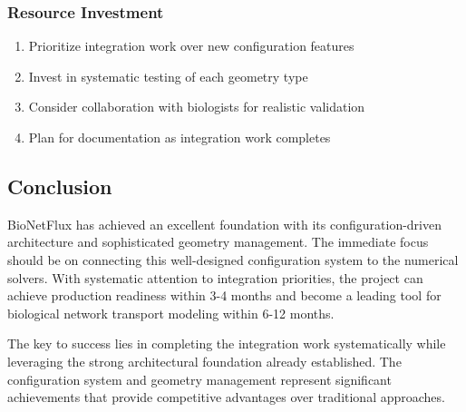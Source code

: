 \subsubsection{Resource Investment}
\begin{enumerate}
    \item Prioritize integration work over new configuration features
    \item Invest in systematic testing of each geometry type
    \item Consider collaboration with biologists for realistic validation
    \item Plan for documentation as integration work completes
\end{enumerate}

\subsection{Conclusion}

BioNetFlux has achieved an excellent foundation with its configuration-driven architecture and sophisticated geometry management. The immediate focus should be on connecting this well-designed configuration system to the numerical solvers. With systematic attention to integration priorities, the project can achieve production readiness within 3-4 months and become a leading tool for biological network transport modeling within 6-12 months.

The key to success lies in completing the integration work systematically while leveraging the strong architectural foundation already established. The configuration system and geometry management represent significant achievements that provide competitive advantages over traditional approaches.

